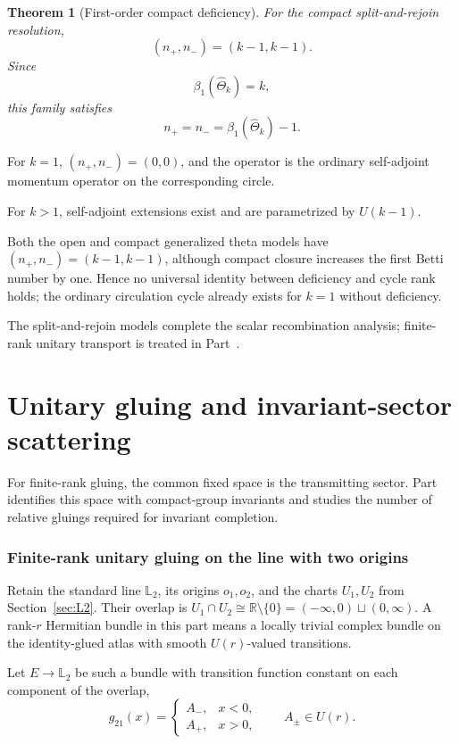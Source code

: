 \documentclass[11pt]{article}
\theoremstyle{plain}
\newtheorem{theorem}{Theorem}[section]
\theoremstyle{definition}
\newcommand{\R}{\mathbb{R}}
\newcommand{\Ltwo}{\mathbb{L}_{2}}
\begin{document}
\begin{theorem}[First-order compact deficiency]
\label{thm:compact-theta-deficiency}
For the compact split-and-rejoin resolution,
\[
  (n_+,n_-)
  =
  (k-1,k-1).
\]
Since
\[
  \beta_1(\widehat\Theta_k)=k,
\]
this family satisfies
\[
  n_+=n_-=\beta_1(\widehat\Theta_k)-1.
\]
\end{theorem}

For \(k=1\),
\((n_+,n_-)=(0,0)\),
and the operator is the ordinary self-adjoint momentum operator on the
corresponding circle.

For \(k>1\), self-adjoint extensions exist and are parametrized by
\(U(k-1)\).

Both the open and compact generalized theta models have \((n_+,n_-)=(k-1,k-1)\), although compact closure increases the first Betti number by one. Hence no universal identity between deficiency and cycle rank holds; the ordinary circulation cycle already exists for \(k=1\) without deficiency.

The split-and-rejoin models complete the scalar recombination analysis; finite-rank unitary transport is treated in Part~\ref{part:unitary-gluing}.

\clearpage
\part{Unitary gluing and invariant-sector scattering}
\label{part:unitary-gluing}

For finite-rank gluing, the common fixed space is the transmitting sector. Part~\ref{part:unitary-gluing} identifies this space with compact-group invariants and studies the number of relative gluings required for invariant completion.

\section{Finite-rank unitary gluing on the line with two origins}
\label{sec:unitary-L2}

Retain the standard line \(\Ltwo\), its origins \(o_1,o_2\), and the
charts \(U_1,U_2\) from Section~\ref{sec:L2}. Their overlap is
\(U_1\cap U_2\cong\R\setminus\{0\} =(-\infty,0)\sqcup(0,\infty)\).
A rank-\(r\) Hermitian bundle in this part means a locally trivial complex
bundle on the identity-glued atlas with smooth \(U(r)\)-valued transitions.

Let \(E\to \Ltwo\) be such a bundle with transition function constant on each component of the overlap,
\[
g_{21}(x)=
\begin{cases}
A_-,&x<0,\\
A_+,&x>0,
\end{cases}
\qquad A_\pm\in U(r).
\]
\end{document}
